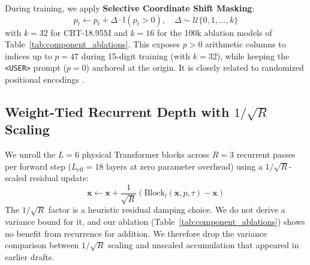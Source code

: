 \documentclass[10pt,twocolumn]{article}
\begin{document}
During training, we apply \textbf{Selective Coordinate Shift Masking}:
\begin{equation}
p_t \leftarrow p_t + \Delta \cdot \mathbb{I}(p_t > 0), \quad \Delta \sim \mathcal{U}\{0, 1, \dots, k\}
\label{eq:shift}
\end{equation}
with $k=32$ for CBT-18.95M and $k=16$ for the 100k ablation models of Table~\ref{tab:component_ablations}. This exposes $p > 0$ arithmetic columns to indices up to $p = 47$ during 15-digit training (with $k=32$), while keeping the \texttt{<USER>} prompt ($p=0$) anchored at the origin. It is closely related to randomized positional encodings \cite{ruoss2023randomized}.

\subsection{Weight-Tied Recurrent Depth with \texorpdfstring{$1/\sqrt{R}$}{1/sqrt(R)} Scaling}

We unroll the $L=6$ physical Transformer blocks across $R=3$ recurrent passes per forward step ($L_{\text{eff}} = 18$ layers at zero parameter overhead) using a $1/\sqrt{R}$-scaled residual update:
\begin{equation}
\mathbf{x} \leftarrow \mathbf{x} + \frac{1}{\sqrt{R}} \left(\text{Block}_l(\mathbf{x}, p, \tau) - \mathbf{x}\right)
\label{eq:recurrence}
\end{equation}
The $1/\sqrt{R}$ factor is a heuristic residual damping choice. We do not derive a variance bound for it, and our ablation (Table~\ref{tab:component_ablations}) shows no benefit from recurrence for addition. We therefore drop the variance comparison between $1/\sqrt{R}$ scaling and unscaled accumulation that appeared in earlier drafts.
\end{document}
